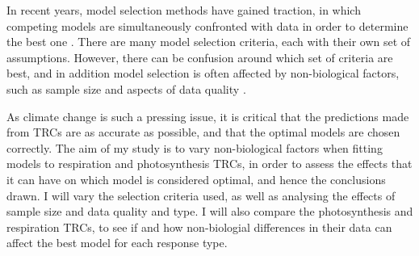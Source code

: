\documentclass[11pt, a4paper]{article}
\begin{document}
In recent years, model selection methods have gained traction, in which competing models are simultaneously confronted with data in order to determine the best one  \cite{johnsonModelSelectionEcology2004}. There are many model selection criteria, each with their own set of assumptions. However, there can be confusion around which set of criteria are best, and in addition model selection is often affected by non-biological factors, such as sample size and aspects of data quality \cite{ModelSelectionMultimodel}.

As climate change is such a pressing issue, it is critical that the predictions made from TRCs are as accurate as possible, and that the optimal models are chosen correctly. The aim of my study is to vary non-biological factors when fitting models to respiration and photosynthesis TRCs, in order to assess the effects that it can have on which model is considered optimal, and hence the conclusions drawn. I will vary the selection criteria used, as well as analysing the effects of sample size and data quality and type. I will also compare the photosynthesis and respiration TRCs, to see if and how non-biologial differences in their data can affect the best model for each response type.






	
	
\end{document}

